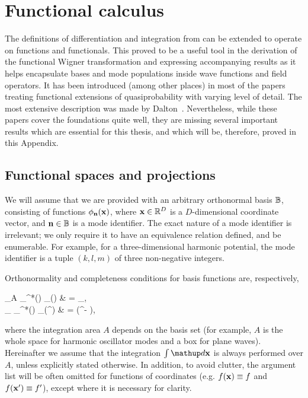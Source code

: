 \chapter{Functional calculus}
\label{cha:appendix:func-calculus}

The definitions of differentiation and integration from  can be extended to operate on functions and functionals.
This proved to be a useful tool in the derivation of the functional Wigner transformation and expressing accompanying results as it helps encapsulate bases and mode populations inside wave functions and field operators.
It has been introduced (among other places) in most of the papers treating functional extensions of quasiprobability with varying level of detail.
The most extensive description was made by Dalton~\cite{Dalton2012}.
Nevertheless, while these papers cover the foundations quite well, they are missing several important results which are essential for this thesis, and which will be, therefore, proved in this Appendix.


\section{Functional spaces and projections}

We will assume that we are provided with an arbitrary orthonormal basis $\mathbb{B}$, consisting of functions $\phi_{\mathbf{n}}(\mathbf{x})$, where $\mathbf{x} \in \mathbb{R}^D$ is a $D$-dimensional coordinate vector, and $\mathbf{n} \in \mathbb{B}$ is a mode identifier.
The exact nature of a mode identifier is irrelevant; we only require it to have an equivalence relation defined, and be enumerable.
For example, for a three-dimensional harmonic potential, the mode identifier is a tuple $(k,l,m)$ of three non-negative integers.

Orthonormality and completeness conditions for basis functions are, respectively,
\begin{eqns}
\label{eqn:func-calculus:basis}
	\int\limits_A \phi_{\nvec}^*(\xvec) \phi_{\mvec}(\xvec) \upd\xvec
	& = \delta_{\nvec\mvec}, \\
	\sum_{\nvec \in \fullbasis} \phi_{\nvec}^*(\xvec) \phi_{\nvec}(\xvec^\prime)
	& = \delta(\xvec^\prime - \xvec),
\end{eqns}
where the integration area $A$ depends on the basis set (for example, $A$ is the whole space for harmonic oscillator modes and a box for plane waves).
Hereinafter we assume that the integration $\int \upd\xvec$ is always performed over $A$, unless explicitly stated otherwise. In addition, to avoid clutter, the argument list will be often omitted for functions of coordinates (e.g. $f(\mathbf{x}) \equiv f$ and $f(\mathbf{x}^\prime) \equiv f^\prime$), except where it is necessary for clarity.

